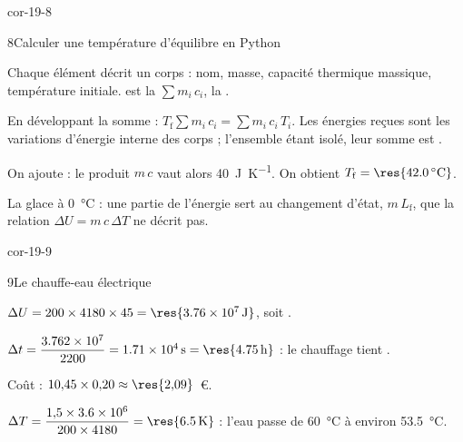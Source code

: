 \begin{blocLivre}{cor-19-8}
\begin{corrige}{8}{Calculer une température d'équilibre en Python}
\begin{questions}
\item Chaque élément décrit un corps : nom, masse, capacité thermique massique, température initiale.  est la
 $\sum m_i\,c_i$,  la .
\item En développant la somme : $T_\mathrm{f}\sum m_i\,c_i=\sum m_i\,c_i\,T_i$. Les énergies reçues sont les variations d'énergie
interne des corps ; l'ensemble étant isolé, leur somme est .
\item On ajoute  : le produit $m\,c$ vaut alors \qty{40}{J.K^{-1}}. On obtient
$T_\mathrm{f}=\res{\qty{42,0}{\degreeCelsius}}$.
\item La glace  à \qty{0}{\degreeCelsius} : une partie de l'énergie sert au changement d'état, $m\,L_\mathrm{f}$, que la
relation $\Delta U=m\,c\,\Delta T$ ne décrit pas.
\end{questions}
\end{corrige}
\end{blocLivre}
\begin{blocLivre}{cor-19-9}
\begin{corrige}{9}{Le chauffe-eau électrique}
\begin{questions}
\item $\Delta U=200\times4180\times45=\res{\qty{3,76e7}{J}}$, soit .
\item $\Delta t=\dfrac{\num{3.762e7}}{2200}=\qty{1,71e4}{s}=\res{\qty{4,75}{h}}$ : le chauffage tient .
\item Coût : $10{,}45\times0{,}20\approx\res{2{,}09}$~€.
\item $\Delta T=\dfrac{1{,}5\times\num{3.6e6}}{200\times4180}=\res{\qty{6,5}{K}}$ : l'eau passe de \qty{60}{\degreeCelsius} à environ
\qty{53,5}{\degreeCelsius}.
\end{questions}
\end{corrige}
\end{blocLivre}
